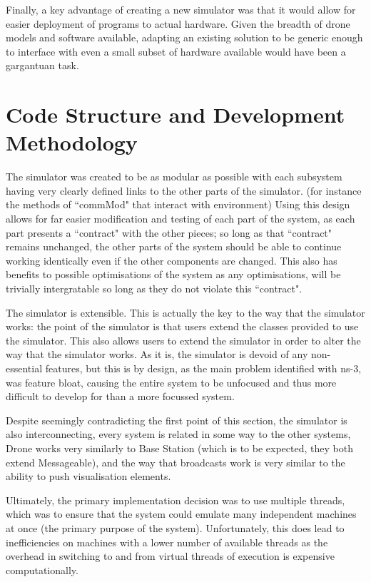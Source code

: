 Finally, a key advantage of creating a new simulator was that it would allow for easier deployment of programs to actual hardware. Given the breadth of drone models and software available, adapting an existing solution to be generic enough to interface with even a small subset of hardware available would have been a gargantuan task.


\section{Code Structure and Development Methodology}
	The simulator was created to be as modular as possible with each subsystem having very clearly defined
	links to the other parts of the simulator. (for instance the methods of ``commMod" that interact
	with environment) Using this design allows for far easier modification and testing of each part
	of the system, as each part presents a ``contract" with the other pieces; so long as that ``contract"
	remains unchanged, the other parts of the system should be able to continue working identically
	even if the other components are changed. This also has benefits to possible optimisations of the system
	as any optimisations, will be trivially intergratable so long as they do not violate this ``contract".

	The simulator is extensible. This is actually the key to the way that the simulator works: the point
	of the simulator is that users extend the classes provided to use the simulator. This also
	allows users to extend the simulator in order to alter the way that the simulator works. As it is,
	the simulator is devoid of any non-essential features, but this is by design, as the main problem
	identified with ns-3, was feature bloat, causing
	the entire system to be unfocused and thus more difficult to develop for than a more focussed system.

	Despite seemingly contradicting the first point of this section, the simulator is also interconnecting,
	every system is related in some way to the other systems, Drone works very similarly to Base Station
	(which is to be expected, they both extend Messageable), and the way that broadcasts work is very similar
	to the ability to push visualisation elements.

	Ultimately, the primary implementation decision was to use multiple threads, which was to ensure that
	the system could emulate many independent machines at once (the primary purpose of the system).
	Unfortunately, this does lead to inefficiencies on machines with a lower number of available threads as
	the overhead in switching to and from virtual threads of execution is expensive computationally.

